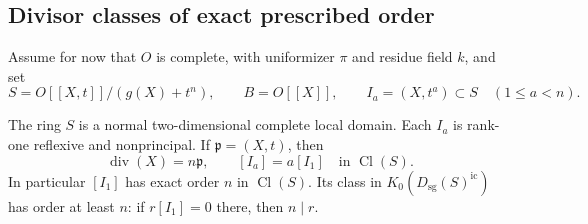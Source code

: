 \subsection{Divisor classes of exact prescribed order}

Assume for now that \(O\) is complete, with uniformizer \(\pi\)
and residue field \(k\), and set
\begin{equation}\label{eq:prime-to-p-surface}
 S=O[[X,t]]/(g(X)+t^n),\qquad B=O[[X]],\qquad
 I_a=(X,t^a)\subset S\quad(1\le a<n).
\end{equation}

\begin{lemma}\label{lem:prime-to-p-surface}
The ring \(S\) is a normal two-dimensional complete local domain.
Each \(I_a\) is rank-one reflexive and nonprincipal.  If
\(\mathfrak p=(X,t)\), then
\[
 \operatorname{div}(X)=n\mathfrak p,\qquad
 [I_a]=a[I_1]\quad\text{in }\operatorname{Cl}(S).
\]
In particular \([I_1]\) has exact order \(n\) in
\(\operatorname{Cl}(S)\).  Its class in
\(K_0(D_{\mathrm{sg}}(S)^{\mathrm{ic}})\) has order at least \(n\):
if \(r[I_1]=0\) there, then \(n\mid r\).
\end{lemma}

